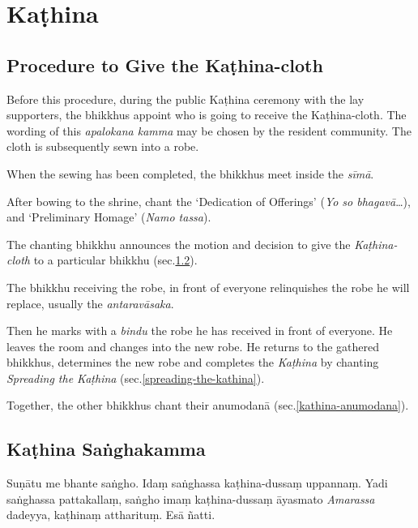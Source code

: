 
\section{Kaṭhina}

\subsection{Procedure to Give the Kaṭhina-cloth}

Before this procedure, during the public Kaṭhina ceremony with the lay
supporters, the bhikkhus appoint who is going to receive the Kaṭhina-cloth. The
wording of this \emph{apalokana kamma} may be chosen by the resident community.
The cloth is subsequently sewn into a robe.

When the sewing has been completed, the bhikkhus meet inside the \emph{sīmā}.

After bowing to the shrine, chant the `Dedication of Offerings' (\emph{Yo so
  bhagavā}\ldots), and `Preliminary Homage' (\emph{Namo tassa}).

The chanting bhikkhu announces the motion and decision to give the
\emph{Kaṭhina-cloth} to a particular bhikkhu (sec.\ref{kathina-sanghakamma}).

The bhikkhu receiving the robe, in front of everyone relinquishes the robe he
will replace, usually the \emph{antaravāsaka}.

Then he marks with a \emph{bindu} the robe he has received in front of everyone. He leaves the room and changes into the new robe. He returns to the
gathered bhikkhus, determines the new robe and completes the \emph{Kaṭhina} by
chanting \emph{Spreading the Kaṭhina} (sec.\ref{spreading-the-kathina}).

Together, the other bhikkhus chant their anumodanā (sec.\ref{kathina-anumodana}).

\subsection{Kaṭhina Saṅghakamma}
\label{kathina-sanghakamma}

\enlargethispage{\baselineskip}


Suṇātu me bhante saṅgho. Idaṃ saṅghassa kaṭhina-dussaṃ uppannaṃ. Yadi saṅghassa
pattakallaṃ, saṅgho imaṃ kaṭhina-dussaṃ āyasmato \emph{Amarassa} dadeyya,
kaṭhinaṃ attharituṃ. Esā ñatti.

